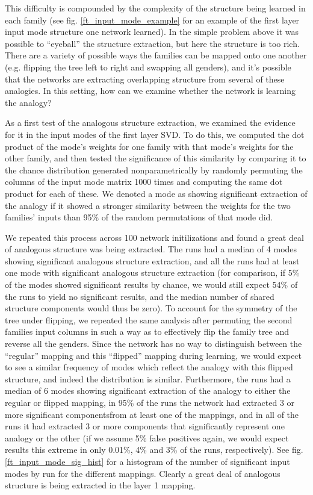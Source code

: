 \documentclass[10pt,letterpaper]{article}
\begin{document}
This difficulty is compounded by the complexity of the structure being learned in each family (see fig. \ref{ft_input_mode_example} for an example of the first layer input mode structure one network learned). In the simple problem above it was possible to ``eyeball'' the structure extraction, but here the structure is too rich. There are a variety of possible ways the families can be mapped onto one another (e.g. flipping the tree left to right and swapping all genders), and it's possible that the networks are extracting overlapping structure from several of these analogies. In this setting, how can we examine whether the network is learning the analogy? \par
As a first test of the analogous structure extraction, we examined the evidence for it in the input modes of the first layer SVD. To do this, we computed the dot product of the mode's weights for one family with that mode's weights for the other family, and then tested the significance of this similarity by comparing it to the chance distribution generated nonparametrically by randomly permuting the columns of the input mode matrix 1000 times and computing the same dot product for each of these. We denoted a mode as showing significant extraction of the analogy if it showed a stronger similarity between the weights for the two families' inputs than 95\% of the random permutations of that mode did. \par
We repeated this process across 100 network initilizations and found a great deal of analogous structure was being extracted. The runs had a median of 4 modes showing significant analogous structure extraction, and all the runs had at least one mode with significant analogous structure extraction (for comparison, if 5\% of the modes showed significant results by chance, we would still expect 54\% of the runs to yield no significant results, and the median number of shared structure components would thus be zero). To account for the symmetry of the tree under flipping, we repeated the same analysis after permuting the second families input columns in such a way as to effectively flip the family tree and reverse all the genders. Since the network has no way to distinguish between the ``regular'' mapping and this ``flipped'' mapping during learning, we would expect to see a similar frequency of modes which reflect the analogy with this flipped structure, and indeed the distribution is similar. Furthermore, the runs had a median of 6 modes showing significant extraction of the analogy to either the regular or flipped mapping, in 95\% of the runs the network had extracted 3 or more significant componentsfrom at least one of the mappings, and in all of the runs it had extracted 3 or more components that significantly represent one analogy or the other (if we assume 5\% false positives again, we would expect results this extreme in only 0.01\%, 4\% and 3\% of the runs, respectively). See fig. \ref{ft_input_mode_sig_hist} for a histogram of the number of significant input modes by run for the different mappings. Clearly a great deal of analogous structure is being extracted in the layer 1 mapping. \par
\end{document}
